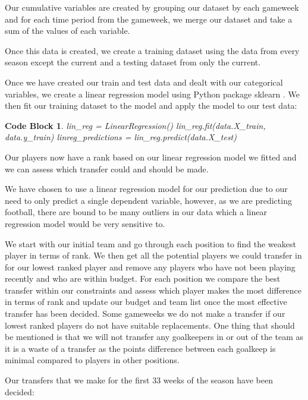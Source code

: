 \documentclass[12pt, a4paper, oneside]{book}
\newtheorem{codeblock}[theorem]{Code Block}
\numberwithin{equation}{section}
\begin{document}
Our cumulative variables are created by grouping our dataset by each gameweek and for each time period from the gameweek, we merge our dataset and take a sum of the values of each variable.

Once this data is created, we create a training dataset using the data from every season except the current and a testing dataset from only the current.

Once we have created our train and test data and dealt with our categorical variables, we create a linear regression model using Python package sklearn \cite{skikit-learn}. We then fit our training dataset to the model and apply the model to our test data:

\begin{codeblock}
  lin\_reg = LinearRegression()
  lin\_reg.fit(data.X\_train, data.y\_train)
  linreg\_predictions = lin\_reg.predict(data.X\_test)
\end{codeblock}

Our players now have a rank based on our linear regression model we fitted and we can assess which transfer could and should be made.

We have chosen to use a linear regression model for our prediction due to our need to only predict a single dependent variable, however, as we are predicting football, there are bound to be many outliers in our data which a linear regression model would be very sensitive to.

We start with our initial team and go through each position to find the weakest player in terms of rank. We then get all the potential players we could transfer in for our lowest ranked player and remove any players who have not been playing recently and who are within budget. For each position we compare the best transfer within our constraints and assess which player makes the most difference in terms of rank and update our budget and team list once the most effective transfer has been decided. Some gameweeks we do not make a transfer if our lowest ranked players do not have suitable replacements. One thing that should be mentioned is that we will not transfer any goalkeepers in or out of the team as it is a waste of a transfer as the points difference between each goalkeep is minimal compared to players in other positions.

Our transfers that we make for the first 33 weeks of the season have been decided:
\end{document}
